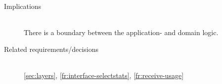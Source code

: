 \begin{description}
\item [Implications]~\\
There is a boundary between the application- and domain logic.

\item [Related requirements/decisions]~\\
\ref{sec:layers}, \ref{fr:interface-selectstats}, \ref{fr:receive-usage}



\end{description}


%
%
%
%
%
%
%
%
